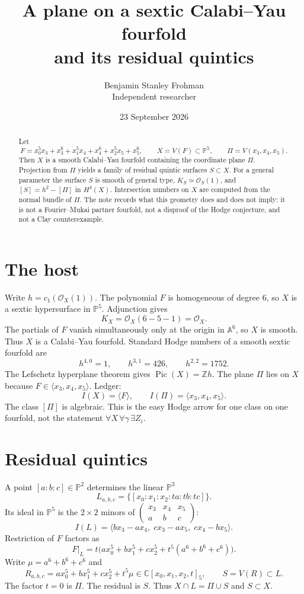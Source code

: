 \documentclass[11pt]{article}
\title{A plane on a sextic Calabi--Yau fourfold\\and its residual quintics}
\author{Benjamin Stanley Frohman\\Independent researcher}
\date{23 September 2026}
\theoremstyle{definition}
\theoremstyle{remark}
\begin{document}
\maketitle

\begin{abstract}
Let
\[
F=x_0^5x_3+x_3^6+x_1^5x_4+x_4^6+x_2^5x_5+x_5^6,\qquad
X=V(F)\subset\mathbb{P}^5,\qquad
\Pi=V(x_3,x_4,x_5).
\]
Then \(X\) is a smooth Calabi--Yau fourfold containing the coordinate plane \(\Pi\). Projection from \(\Pi\) yields a family of residual quintic surfaces \(S\subset X\). For a general parameter the surface \(S\) is smooth of general type, \(K_S\simeq\mathcal{O}_S(1)\), and \([S]=h^2-[\Pi]\) in \(H^4(X)\). Intersection numbers on \(X\) are computed from the normal bundle of \(\Pi\). The note records what this geometry does and does not imply: it is not a Fourier--Mukai partner fourfold, not a disproof of the Hodge conjecture, and not a Clay counterexample.
\end{abstract}

\section{The host}

Write \(h=c_1(\mathcal{O}_X(1))\). The polynomial \(F\) is homogeneous of degree \(6\), so \(X\) is a sextic hypersurface in \(\mathbb{P}^5\). Adjunction gives
\[
K_X=\mathcal{O}_X(6-5-1)=\mathcal{O}_X.
\]
The partials of \(F\) vanish simultaneously only at the origin in \(\mathbb{A}^6\), so \(X\) is smooth. Thus \(X\) is a Calabi--Yau fourfold. Standard Hodge numbers of a smooth sextic fourfold are
\[
h^{4,0}=1,\qquad h^{3,1}=426,\qquad h^{2,2}=1752.
\]
The Lefschetz hyperplane theorem gives \(\operatorname{Pic}(X)=\mathbb{Z}h\). The plane \(\Pi\) lies on \(X\) because \(F\in\langle x_3,x_4,x_5\rangle\). Ledger:
\[
I(X)=\langle F\rangle,\qquad I(\Pi)=\langle x_3,x_4,x_5\rangle.
\]
The class \([\Pi]\) is algebraic. This is the easy Hodge arrow for one class on one fourfold, not the statement \(\forall X\,\forall\gamma\,\exists Z_i\).

\section{Residual quintics}

A point \([a:b:c]\in\mathbb{P}^2\) determines the linear \(\mathbb{P}^3\)
\[
L_{a,b,c}=\bigl\{[x_0:x_1:x_2:ta:tb:tc]\bigr\}.
\]
Its ideal in \(\mathbb{P}^5\) is the \(2\times 2\) minors of \(\begin{pmatrix}x_3&x_4&x_5\\ a&b&c\end{pmatrix}\):
\[
I(L)=\langle bx_3-ax_4,\; cx_3-ax_5,\; cx_4-bx_5\rangle.
\]
Restriction of \(F\) factors as
\[
F\big|_{L}=t\bigl(ax_0^5+bx_1^5+cx_2^5+t^5(a^6+b^6+c^6)\bigr).
\]
Write \(\mu=a^6+b^6+c^6\) and
\[
R_{a,b,c}=ax_0^5+bx_1^5+cx_2^5+t^5\mu\in\mathbb{C}[x_0,x_1,x_2,t]_5,
\qquad
S=V(R)\subset L.
\]
The factor \(t=0\) is \(\Pi\). The residual is \(S\). Thus \(X\cap L=\Pi\cup S\) and \(S\subset X\).
\end{document}
